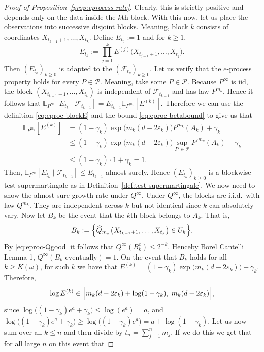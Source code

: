 \documentclass[11pt]{article}
\newcommand{\E}{\mathbb{E}}
\newcommand{\Pcal}{\mathcal{P}}
\theoremstyle{definition}
\theoremstyle{definition}
\begin{document}
\begin{proof}[Proof of Proposition~\ref{prop:eprocess-rate}]
Clearly, this is strictly positive and depends only on the data inside the $k$th block. With this now, let us place the observations into successive disjoint blocks. Meaning, block $k$ consists of coordinates $X_{t_{k-1}+1},\dots,X_{t_k}$. Define $E_{t_0}:=1$ and for $k\ge 1$,
\[
E_{t_k}:=\prod_{j=1}^k E^{(j)}\bigl(X_{t_{j-1}+1},\dots,X_{t_j}\bigr).
\]
Then $(E_{t_k})_{k\ge 0}$ is adapted to the $(\mathcal F_{t_k})_{k\ge 0}$. Let us verify that the $e$-process property holds for every $P\in\Pcal$. Meaning, take some $P\in\Pcal$. Because $P^\infty$ is iid, the block $(X_{t_{k-1}+1},\dots, X_{t_k})$ is independent of $\mathcal F_{t_{k-1}}$ and has law $P^{m_k}$. Hence it follows that $\E_{P^\infty}[E_{t_k}\mid \mathcal F_{t_{k-1}}]= E_{t_{k-1}}\E_{P^{m_k}}\left[E^{(k)}\right]$. Therefore we can use the definition \eqref{eq:eproc-blockE} and the bound \eqref{eq:eproc-betabound} to give us that
\begin{align*}
\E_{P^{m_k}}\left[E^{(k)}\right]&=(1-\gamma_k)\exp\bigl(m_k(d-2\varepsilon_k)\bigr)P^{m_k}(A_k)+\gamma_k\\
&\le(1-\gamma_k)\exp\bigl(m_k(d-2\varepsilon_k)\bigr)\sup_{P'\in\Pcal}P'^{m_k}(A_k)+\gamma_k\\
&\le(1-\gamma_k)\cdot 1+\gamma_k=1.
\end{align*}
Then, $\E_{P^\infty}[E_{t_k}\mid\mathcal F_{t_{k-1}}]\le E_{t_{k-1}}$ almost surely. Hence $(E_{t_k})_{k\ge 0}$ is a blockwise test supermartingale as in Definition~\ref{def:test-supermartingale}. We now need to show the almost-sure growth rate under $Q^\infty$. Under $Q^\infty$, the blocks are i.i.d.\ with law $Q^{m_k}$. They are independent across $k$ but not identical since $k$ can absolutely vary. Now let $B_k$ be the event that the $k$th block belongs to $A_k$. That is,
\[
B_k:=\Bigl\{\widehat Q_{m_k}\bigl(X_{t_{k-1}+1},\dots,X_{t_k}\bigr)\in U_k\Bigr\}.
\]
By \eqref{eq:eproc-Qgood} it follows that $Q^\infty(B_k^c)\le 2^{-k}$. Henceby Borel Cantelli Lemma 1, $Q^\infty(B_k\text{ eventually})=1$. On the event that $B_k$ holds for all $k\ge K(\omega)$, for such $k$ we have that $E^{(k)}=(1-\gamma_k)\exp\bigl(m_k(d-2\varepsilon_k)\bigr)+\gamma_k$. Therefore,
\[
\log E^{(k)} \in \Bigl[m_k(d-2\varepsilon_k)+\log(1-\gamma_k),\;m_k(d-2\varepsilon_k)\Bigr],
\]
since $\log\bigl((1-\gamma_k)e^{a}+\gamma_k\bigr)\le \log(e^a)=a$, and $\log\bigl((1-\gamma_k)e^{a}+\gamma_k\bigr)\ge \log\bigl((1-\gamma_k)e^{a}\bigr)=a+\log(1-\gamma_k)$. Let us now sum over all $k\le n$ and then divide by $t_n=\sum_{j=1}^n m_j$. If we do this we get that for all large $n$ on this event that

\end{proof}
\end{document}
